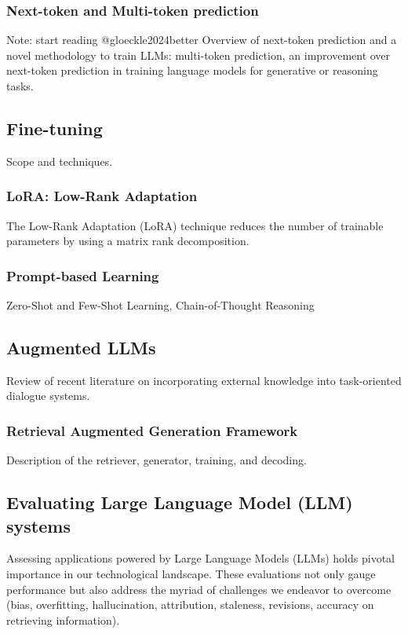 \documentclass[12pt]{article}
\begin{document}
\subsubsection{Next-token and Multi-token prediction}
Note: start reading @gloeckle2024better \newline
Overview of next-token prediction and a novel methodology to train LLMs: multi-token prediction, an improvement over next-token prediction in training language models for generative or reasoning tasks. 

\subsection{Fine-tuning}
Scope and techniques.

\subsubsection{LoRA: Low-Rank Adaptation}
The Low-Rank Adaptation (LoRA) technique reduces the number of trainable parameters by using a matrix rank decomposition.

\subsubsection{Prompt-based Learning}
Zero-Shot and Few-Shot Learning, Chain-of-Thought Reasoning

\subsection{Augmented LLMs}
Review of recent literature on incorporating external knowledge into task-oriented dialogue systems.

\subsubsection{Retrieval Augmented Generation Framework}
Description of the retriever, generator, training, and decoding.

\subsection{Evaluating Large Language Model (LLM) systems}
Assessing applications powered by Large Language Models (LLMs) holds pivotal importance in our technological landscape. These evaluations not only gauge performance but also address the myriad of challenges we endeavor to overcome (bias, overfitting, hallucination, attribution, staleness, revisions, accuracy on retrieving information).
\end{document}
